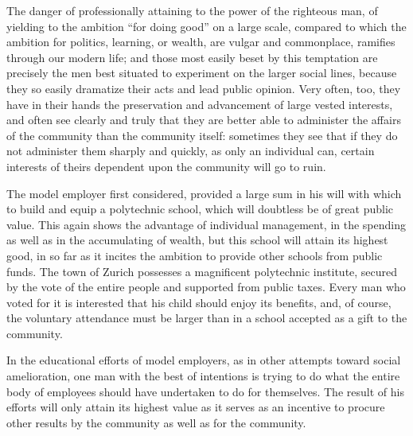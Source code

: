\documentclass[]{article}
\begin{document}
\begin{sectionbody}
\addamsparagraph The danger of professionally attaining to the power of the righteous
man, of yielding to the ambition ``for doing good'' on a large scale,
compared to which the ambition for politics, learning, or wealth, are
vulgar and commonplace, ramifies through our modern life; and those most
easily beset by this temptation are precisely the men best situated to
experiment on the larger social lines, because they so easily dramatize
their acts and lead public opinion. Very often, too, they have in their
hands the preservation and advancement of large vested interests, and
often see clearly and truly that they are better able to administer the
affairs of the community than the community itself: sometimes they see
that if they do not administer them sharply and quickly, as only an
individual can, certain interests of theirs dependent upon the community
will go to ruin.

\addamsparagraph The model employer first considered, provided a large sum in his will
with which to build and equip a polytechnic school, which will doubtless
be of great public value. This again shows the advantage of individual
management, in the spending as well as in the accumulating of wealth,
but this school will attain its highest good, in so far as it incites
the ambition to provide other schools from public funds. The town of
Zurich possesses a magnificent polytechnic institute, secured by the
vote of the entire people and supported from public taxes. Every man who
voted for it is interested that his child should enjoy its benefits,
and, of course, the voluntary attendance must be larger than in a
school accepted as a gift to the community.

\addamsparagraph In the educational efforts of model employers, as in other attempts
toward social amelioration, one man with the best of intentions is
trying to do what the entire body of employees should have undertaken to
do for themselves. The result of his efforts will only attain its
highest value as it serves as an incentive to procure other results by
the community as well as for the community.


\end{sectionbody}
\end{document}

